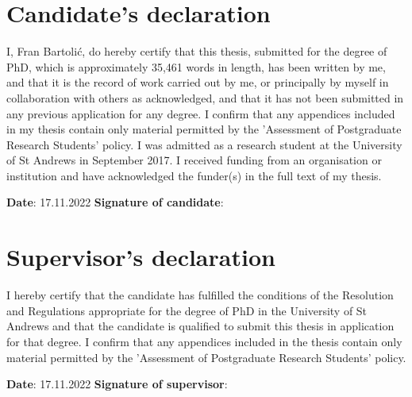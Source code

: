 \documentclass[12pt,dvipsnames]{report}
\begin{document}
\section*{Candidate's declaration}
I, Fran Bartoli\'{c}, do hereby certify that this thesis, submitted for the degree of $\mathrm{PhD}$, which is approximately 35,461 words in length, has been written by me, and that it is the record of work carried out by me, or principally by myself in collaboration with others as acknowledged, and that it has not been submitted in any previous application for any degree. I confirm that any appendices included in my thesis contain only material permitted by the 'Assessment of Postgraduate Research Students' policy.
\newline
\newline
\noindent I was admitted as a research student at the University of St Andrews in September 2017.
\newline
\newline
\noindent I received funding from an organisation or institution and have acknowledged the funder(s) in the full text of my thesis.

\vspace{1cm}
\noindent \textbf{Date}: 17.11.2022 \quad\quad \textbf{Signature of candidate}: 

\section*{Supervisor's declaration}
I hereby certify that the candidate has fulfilled the conditions of the Resolution and Regulations appropriate for the degree of $\mathrm{PhD}$ in the University of St Andrews and that the candidate is qualified to submit this thesis in application for that degree. I confirm that any appendices included in the thesis contain only material permitted by the 'Assessment of Postgraduate Research Students' policy.
\vspace{1cm}

\noindent \textbf{Date}: 17.11.2022 \quad\quad \textbf{Signature of supervisor}: 
\end{document}
